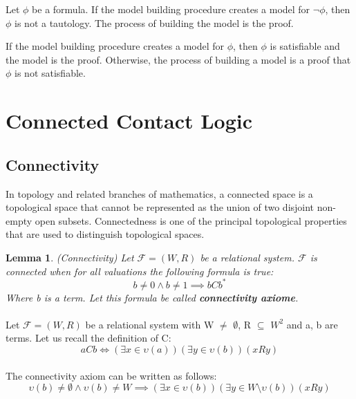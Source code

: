 \documentclass{article}
\newcommand\F{\mathcal{F}}
\newtheorem{lemma}[theorem]{Lemma}
\begin{document}
	Let $\phi$ be a formula. If the model building procedure creates a model for $\neg\phi$, then $\phi$ is not a tautology. The process of building the model is the proof.

	If the model building procedure creates a model for $\phi$, then $\phi$ is satisfiable and the model is the proof. Otherwise, the process of building a model is a proof that $\phi$ is not satisfiable.

	\section{Connected Contact Logic}

	\subsection{Connectivity}
	In topology and related branches of mathematics, a connected space is a topological space that cannot be represented as the union of two disjoint non-empty open subsets. Connectedness is one of the principal topological properties that are used to distinguish topological spaces.

	\begin{lemma}
		(Connectivity) Let $\F = (W, R)$ be a relational system. $\F$ is connected when for all valuations the following formula is true:
		\label{connectivity-theorem}\begin{equation}
			b \neq 0 \land b \neq 1 \implies bCb^*
		\end{equation}
		Where b is a term.
		Let this formula be called \textbf{connectivity axiome}.
	\end{lemma}

	\paragraph{} Let $\F = (W, R)$ be a relational system with W $\neq$ $\emptyset$, R $\subseteq$ $W^2$ and a, b are terms. Let us recall the definition of C:
	\begin{equation*}
		aCb \iff (\exists x \in \upsilon(a)) (\exists y \in \upsilon(b))(xRy)
	\end{equation*}

	\paragraph{} The connectivity axiom can be written as follows:
	\begin{equation}
		\upsilon(b) \neq \emptyset \land \upsilon(b) \neq W \implies (\exists x \in \upsilon(b)) (\exists y \in W \setminus \upsilon(b))(xRy)
	\end{equation}
\end{document}
